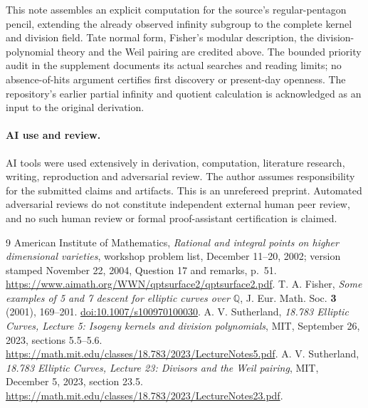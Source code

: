 \documentclass[11pt]{article}
\newcommand{\Q}{\mathbb Q}
\begin{document}
This note assembles an explicit computation for the source's
regular-pentagon pencil, extending the already observed infinity
subgroup to the complete kernel and division field. Tate normal form,
Fisher's modular description, the division-polynomial theory and the
Weil pairing are credited above. The bounded priority audit in the
supplement documents its actual searches and reading limits; no
absence-of-hits argument certifies first discovery or present-day
openness. The repository's earlier partial infinity and quotient
calculation is acknowledged as an input to the original derivation.

\paragraph{AI use and review.}
AI tools were used extensively in derivation, computation, literature
research, writing, reproduction and adversarial review. The author
assumes responsibility for the submitted claims and artifacts. This
is an unrefereed preprint. Automated adversarial reviews do not
constitute independent external human peer review, and no such human
review or formal proof-assistant certification is claimed.

\begin{thebibliography}{9}
 American Institute of Mathematics,
\emph{Rational and integral points on higher dimensional varieties},
workshop problem list, December 11--20, 2002; version stamped
November 22, 2004, Question 17 and remarks, p.~51.
\url{https://www.aimath.org/WWN/qptsurface2/qptsurface2.pdf}.
 T. A. Fisher, \emph{Some examples of 5 and 7 descent for
elliptic curves over $\Q$}, J. Eur. Math. Soc. \textbf{3} (2001), 169--201.
\href{https://doi.org/10.1007/s100970100030}{doi:10.1007/s100970100030}.
 A. V. Sutherland, \emph{18.783 Elliptic Curves,
Lecture 5: Isogeny kernels and division polynomials}, MIT, September 26, 2023,
sections 5.5--5.6.
\url{https://math.mit.edu/classes/18.783/2023/LectureNotes5.pdf}.
 A. V. Sutherland, \emph{18.783 Elliptic Curves,
Lecture 23: Divisors and the Weil pairing}, MIT, December 5, 2023, section 23.5.
\url{https://math.mit.edu/classes/18.783/2023/LectureNotes23.pdf}.
\end{thebibliography}
\end{document}
